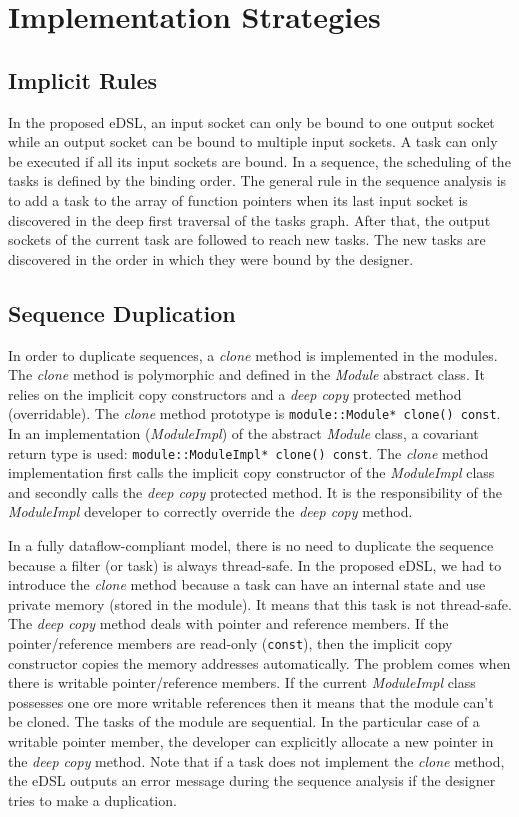 \section{Implementation Strategies}

\subsection{Implicit Rules}

In the proposed eDSL, an input socket can only be bound to one output socket
while an output socket can be bound to multiple input sockets. A task can only
be executed if all its input sockets are bound. In a sequence, the scheduling of
the tasks is defined by the binding order. The general rule in the sequence
analysis is to add a task to the array of function pointers when its last input
socket is discovered in the deep first traversal of the tasks graph. After that,
the output sockets of the current task are followed to reach new tasks. The new
tasks are discovered in the order in which they were bound by the designer.

\subsection{Sequence Duplication}

In order to duplicate sequences, a \emph{clone} method is implemented in the
modules. The \emph{clone} method is polymorphic and defined in the \emph{Module}
abstract class. It relies on the implicit copy constructors and a \emph{deep
copy} protected method (overridable). The \emph{clone} method prototype is
\verb|module::Module* clone() const|. In an implementation (\emph{ModuleImpl})
of the abstract \emph{Module} class, a covariant return type is used:
\verb|module::ModuleImpl* clone() const|. The \emph{clone} method implementation
first calls the implicit copy constructor of the \emph{ModuleImpl} class and
secondly calls the \emph{deep copy} protected method. It is the responsibility
of the \emph{ModuleImpl} developer to correctly override the \emph{deep copy}
method.

In a fully dataflow-compliant model, there is no need to duplicate the sequence
because a filter (or task) is always thread-safe. In the proposed eDSL, we had
to introduce the \emph{clone} method because a task can have an internal state
and use private memory (stored in the module). It means that this task is not
thread-safe. The \emph{deep copy} method deals with pointer and reference
members. If the pointer/reference members are read-only (\verb|const|), then the
implicit copy constructor copies the memory addresses automatically. The problem
comes when there is writable pointer/reference members. If the current
\emph{ModuleImpl} class possesses one ore more writable references then it means
that the module can't be cloned. The tasks of the module are sequential. In
the particular case of a writable pointer member, the developer can explicitly
allocate a new pointer in the \emph{deep copy} method. Note that if a task does
not implement the \emph{clone} method, the eDSL outputs an error message during
the sequence analysis if the designer tries to make a duplication.

